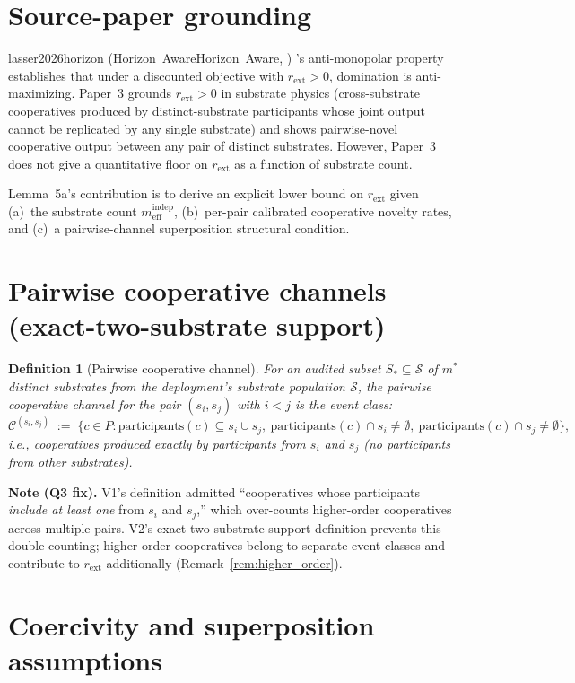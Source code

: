 \documentclass{article}
\makeatletter
\newcommand{\citep}[2][]{%
  \begingroup
  \def\@tmpkey{#2}%
  \ifx\@tmpkey\@empty\else
    (\ifx\@empty#1\@empty\else #1, \fi
     \@nameuse{bibkey@\@tmpkey})%
  \fi
  \endgroup
}
\newtheorem{definition}{Definition}
\newcommand{\rext}{r_{\mathrm{ext}}}
\newcommand{\mindep}{m_{\mathrm{eff}}^{\mathrm{indep}}}
\newcommand{\Saudit}{S_*}
\makeatother
\begin{document}
\section{Source-paper grounding}

\citep[Horizon~Aware]{lasser2026horizon}'s anti-monopolar property
establishes that under a discounted objective with $\rext > 0$,
domination is anti-maximizing.  Paper~3 grounds $\rext > 0$ in
substrate physics (cross-substrate cooperatives produced by
distinct-substrate participants whose joint output cannot be
replicated by any single substrate) and shows pairwise-novel
cooperative output between any pair of distinct substrates.
However, Paper~3 does not give a quantitative floor on $\rext$ as a
function of substrate count.

Lemma~5a's contribution is to derive an explicit lower bound on
$\rext$ given (a)~the substrate count $\mindep$, (b)~per-pair
calibrated cooperative novelty rates, and (c)~a pairwise-channel
superposition structural condition.

\section{Pairwise cooperative channels (exact-two-substrate support)}

\begin{definition}[Pairwise cooperative channel]
\label{def:pairwise_channel}
For an audited subset $\Saudit \subseteq \mathcal{S}$ of $m^*$
distinct substrates from the deployment's substrate population
$\mathcal{S}$, the \emph{pairwise cooperative channel} for the pair
$(s_i, s_j)$ with $i < j$ is the event class:
\[
  \mathcal{C}^{(s_i, s_j)} \;:=\; \{c \in P :
  \mathrm{participants}(c) \subseteq s_i \cup s_j,\
  \mathrm{participants}(c) \cap s_i \neq \emptyset,\
  \mathrm{participants}(c) \cap s_j \neq \emptyset\},
\]
i.e., cooperatives produced \emph{exactly} by participants from
$s_i$ and $s_j$ (no participants from other substrates).
\end{definition}

\textbf{Note (Q3 fix).}  V1's definition admitted ``cooperatives
whose participants \emph{include at least one} from $s_i$ and
$s_j$,'' which over-counts higher-order cooperatives across multiple
pairs.  V2's exact-two-substrate-support definition prevents this
double-counting; higher-order cooperatives belong to separate
event classes and contribute to $\rext$ additionally
(Remark~\ref{rem:higher_order}).

\section{Coercivity and superposition assumptions}
\end{document}

